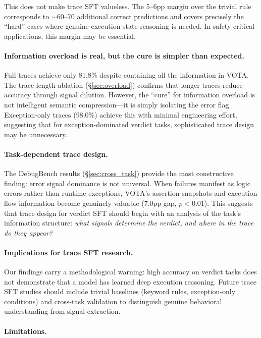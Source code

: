 \documentclass[11pt,a4paper]{article}
\begin{document}
This does not make trace SFT valueless.
The 5--6pp margin over the trivial rule corresponds to $\sim$60--70 additional correct predictions and covers precisely the ``hard'' cases where genuine execution state reasoning is needed.
In safety-critical applications, this margin may be essential.

\paragraph{Information overload is real, but the cure is simpler than expected.}

Full traces achieve only 81.8\% despite containing all the information in VOTA.
The trace length ablation (\S\ref{sec:overload}) confirms that longer traces reduce accuracy through signal dilution.
However, the ``cure'' for information overload is not intelligent semantic compression---it is simply isolating the error flag.
Exception-only traces (98.0\%) achieve this with minimal engineering effort, suggesting that for exception-dominated verdict tasks, sophisticated trace design may be unnecessary.

\paragraph{Task-dependent trace design.}

The DebugBench results (\S\ref{sec:cross_task}) provide the most constructive finding: error signal dominance is not universal.
When failures manifest as logic errors rather than runtime exceptions, VOTA's assertion snapshots and execution flow information become genuinely valuable (7.0pp gap, $p<0.01$).
This suggests that trace design for verdict SFT should begin with an analysis of the task's information structure: \emph{what signals determine the verdict, and where in the trace do they appear?}

\paragraph{Implications for trace SFT research.}

Our findings carry a methodological warning: high accuracy on verdict tasks does not demonstrate that a model has learned deep execution reasoning.
Future trace SFT studies should include trivial baselines (keyword rules, exception-only conditions) and cross-task validation to distinguish genuine behavioral understanding from signal extraction.

\paragraph{Limitations.}
\end{document}
